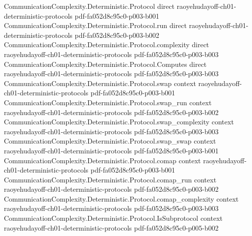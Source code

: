 \begin{theorem}
\label{CommunicationComplexity.Functions.Disjointness.communicationComplexity_eq}
\leanok
{}
\proofstep
  {CommunicationComplexity.Deterministic.Protocol}
  {direct}
  {raoyehudayoff-ch01-deterministic-protocols}
  {pdf-fa052d8c95c0-p003-b001}
\proofstep
  {CommunicationComplexity.Deterministic.Protocol.run}
  {direct}
  {raoyehudayoff-ch01-deterministic-protocols}
  {pdf-fa052d8c95c0-p003-b002}
\proofstep
  {CommunicationComplexity.Deterministic.Protocol.complexity}
  {direct}
  {raoyehudayoff-ch01-deterministic-protocols}
  {pdf-fa052d8c95c0-p003-b003}
\proofstep
  {CommunicationComplexity.Deterministic.Protocol.Computes}
  {direct}
  {raoyehudayoff-ch01-deterministic-protocols}
  {pdf-fa052d8c95c0-p003-b003}
\proofstep
  {CommunicationComplexity.Deterministic.Protocol.swap}
  {context}
  {raoyehudayoff-ch01-deterministic-protocols}
  {pdf-fa052d8c95c0-p003-b001}
\proofstep
  {CommunicationComplexity.Deterministic.Protocol.swap_run}
  {context}
  {raoyehudayoff-ch01-deterministic-protocols}
  {pdf-fa052d8c95c0-p003-b002}
\proofstep
  {CommunicationComplexity.Deterministic.Protocol.swap_complexity}
  {context}
  {raoyehudayoff-ch01-deterministic-protocols}
  {pdf-fa052d8c95c0-p003-b003}
\proofstep
  {CommunicationComplexity.Deterministic.Protocol.swap_swap}
  {context}
  {raoyehudayoff-ch01-deterministic-protocols}
  {pdf-fa052d8c95c0-p003-b001}
\proofstep
  {CommunicationComplexity.Deterministic.Protocol.comap}
  {context}
  {raoyehudayoff-ch01-deterministic-protocols}
  {pdf-fa052d8c95c0-p003-b001}
\proofstep
  {CommunicationComplexity.Deterministic.Protocol.comap_run}
  {context}
  {raoyehudayoff-ch01-deterministic-protocols}
  {pdf-fa052d8c95c0-p003-b002}
\proofstep
  {CommunicationComplexity.Deterministic.Protocol.comap_complexity}
  {context}
  {raoyehudayoff-ch01-deterministic-protocols}
  {pdf-fa052d8c95c0-p003-b003}
\proofstep
  {CommunicationComplexity.Deterministic.Protocol.IsSubprotocol}
  {context}
  {raoyehudayoff-ch01-deterministic-protocols}
  {pdf-fa052d8c95c0-p005-b002}

\end{theorem}
